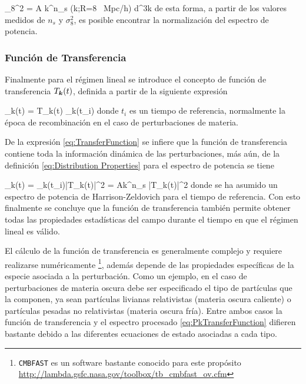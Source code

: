 { \sigma_8^2 = A\int {} k^{n_s}
 (k;R=8 \mbox{ Mpc}/h) d^3\bds k }
de esta forma, a partir de los valores medidos de $n_s$ y $\sigma_8^2$, es
posible encontrar la normalización del espectro de potencia.


			\subsubsection*{Función de Transferencia}
			

Finalmente para el régimen lineal se introduce el concepto de función de 
trans\-ferencia $T_{\boldsymbol{ k }}(t)$, definida a partir de la siguiente 
expresión


{ \delta_{\bds k}(t) = T_{\bds k}(t) \delta_{\bds k}(t_i) }
donde $t_i$ es un tiempo de referencia, normalmente la época de 
recombinación en el caso de perturbaciones de materia.


De la expresión \ref{eq:TransferFunction} se infiere que la función de 
transferencia contiene toda la información dinámica de las perturbaciones,
más aún, de la definición \ref{eq:Distribution Properties} para el espectro
de potencia se tiene


{ \sigma_k(t) = \sigma_k(t_i)|T_k(t)|^2 = Ak^{n_s} |T_k(t)|^2 }
donde se ha asumido un espectro de potencia de Harrison-Zeldovich para el 
tiempo de referencia. Con esto finalmente se concluye que la función de 
transferencia también permite obtener todas las propiedades estadísticas 
del campo durante el tiempo en que el régimen lineal es válido.


El cálculo de la función de transferencia es generalmente complejo y 
requiere realizarse numéricamente \footnote{\texttt{CMBFAST} es un 
software bastante conocido para este propósito 
\url{http://lambda.gsfc.nasa.gov/toolbox/tb_cmbfast_ov.cfm}}, además
depende de las propiedades específicas de la especie asociada a la
perturbación. Como un ejemplo, en el caso de perturbaciones de materia 
oscura debe ser especificado el tipo de partículas que la componen, ya 
sean partículas livianas relativistas (materia oscura caliente) o 
partículas pesadas no relativistas (materia oscura fría). Entre ambos 
casos la función de transferencia y el espectro procesado 
\ref{eq:PkTransferFunction} difieren bastante debido a las diferentes 
ecuaciones de estado asociadas a cada tipo.


